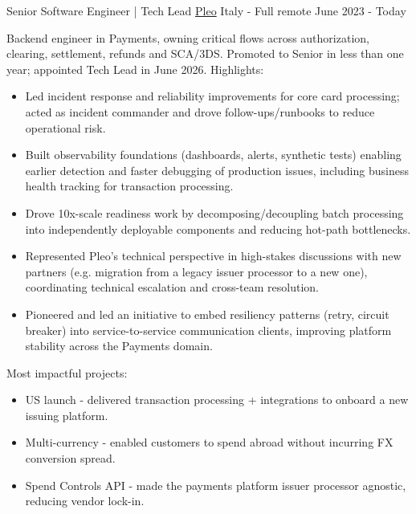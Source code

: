 

\begin{cventries}

\cventry
	{Senior Software Engineer | Tech Lead} %
	{\href{https://pleo.io/}{Pleo}} %
	{Italy - Full remote} %
	{June 2023 - Today} %
	{
		Backend engineer in Payments, owning critical flows across authorization, clearing, settlement, refunds and SCA/3DS. Promoted to Senior in less than one year; appointed Tech Lead in June 2026.
		Highlights:
		\begin{itemize}
			\item {Led incident response and reliability improvements for core card processing; acted as incident commander and drove follow-ups/runbooks to reduce operational risk.}
			\item {Built observability foundations (dashboards, alerts, synthetic tests) enabling earlier detection and faster debugging of production issues, including business health tracking for transaction processing.}
			\item {Drove 10x-scale readiness work by decomposing/decoupling batch processing into independently deployable components and reducing hot-path bottlenecks.}
			\item {Represented Pleo’s technical perspective in high-stakes discussions with new partners (e.g. migration from a legacy issuer processor to a new one), coordinating technical escalation and cross-team resolution.}
			\item {Pioneered and led an initiative to embed resiliency patterns (retry, circuit breaker) into service-to-service communication clients, improving platform stability across the Payments domain.}
		\end{itemize}
		Most impactful projects:
		\begin{itemize}
			\item {US launch - delivered transaction processing + integrations to onboard a new issuing platform.}
		  	\item {Multi-currency - enabled customers to spend abroad without incurring FX conversion spread.}
			\item {Spend Controls API - made the payments platform issuer processor agnostic, reducing vendor lock-in.}
		\end{itemize}
	}


\end{cventries}
